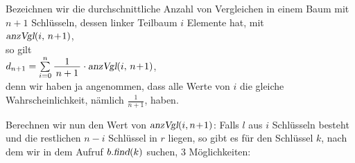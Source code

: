 Bezeichnen wir die durchschnittliche Anzahl von Vergleichen in einem Baum mit $n+1$
Schl\"usseln, dessen linker Teilbaum $i$ Elemente hat, mit
\\[0.2cm]
\hspace*{1.3cm}
$\textsl{anzVgl}(i,\, n\!+\!1)$,
\\
so gilt
\\[-0.1cm]
\hspace*{1.3cm}
$d_{n+1} = \sum\limits_{i=0}^n \bruch{1}{n+1} \cdot \textsl{anzVgl}(i,\, n\!+\!1)$,
\\[0.2cm]
denn wir haben ja angenommen, dass alle Werte von $i$ die gleiche Wahrscheinlichkeit,
n\"amlich $\frac{1}{n+1}$, haben.
\vspace*{0.1cm}

Berechnen wir nun den Wert von $\textsl{anzVgl}(i,n\!+\!1)$:
Falls $l$ aus $i$ Schl\"usseln besteht und die restlichen $n-i$ Schl\"ussel in $r$ liegen,
so gibt es f\"ur den Schl\"ussel $k$, nach dem wir in dem Aufruf $b.\textsl{find}(k)$ suchen, 
$3$ M\"oglichkeiten:
